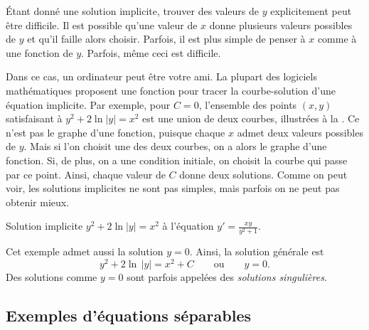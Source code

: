 Étant donné une solution implicite, trouver des valeurs de $y$ explicitement peut être difficile.
Il est possible qu'une valeur de $x$ donne plusieurs valeurs possibles de $y$ et qu'il faille alors choisir.
Parfois, il est plus simple de penser à $x$ comme à une fonction de $y$.  Parfois, même ceci est difficile.

Dans ce cas, un ordinateur peut être votre ami.  La plupart des logiciels mathématiques proposent
une fonction pour tracer la courbe-solution d'une équation implicite.
Par exemple, pour $C=0$, l'ensemble des points $(x,y)$ satisfaisant à  $y^2+2\ln|y|=x^2$
est une union de deux courbes, illustrées à la .
Ce n'est pas le graphe d'une fonction, puisque chaque $x$ admet deux valeurs possibles de $y$.
Mais si l'on choisit une des deux courbes, on a alors le graphe d'une fonction.
Si, de plus, on a une condition initiale, on choisit la courbe qui passe par ce point.
Ainsi, chaque valeur de $C$ donne deux solutions.
Comme on peut voir, les solutions implicites ne sont pas simples, mais parfois on ne peut pas obtenir mieux.

\begin{myfig}
	\capstart {}
	\caption{Solution implicite $y^2+2\ln|y|=x^2$ à l'équation $y'=\frac{xy}{y^2+1}$.\label{implicitsols:fig}}
\end{myfig}

Cet exemple admet aussi la solution $y=0$.
Ainsi, la solution générale est
\begin{equation*}
	y^2 + 2 \ln \, \lvert y \rvert = x^2 + C \qquad \text{ou} \qquad y=0.
\end{equation*}
Des solutions comme $y=0$
sont parfois appelées des \emph{solutions singulières}.



\subsection{Exemples d'équations séparables}

